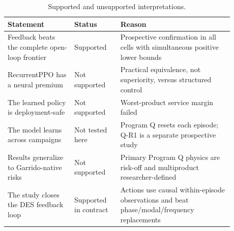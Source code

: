 \begin{table}[htbp]
\centering
\small
\caption{Supported and unsupported interpretations.}
\label{tab:claim_boundary}
\begin{tabular}{p{0.26\linewidth}p{0.18\linewidth}p{0.44\linewidth}}
\toprule
Statement & Status & Reason \\
\midrule
Feedback beats the complete open-loop frontier & Supported & Prospective confirmation in all cells with simultaneous positive lower bounds \\
RecurrentPPO has a neural premium & Not supported & Practical equivalence, not superiority, versus structured control \\
The learned policy is deployment-safe & Not supported & Worst-product service margin failed \\
The model learns across campaigns & Not tested here & Program Q resets each episode; Q-R1 is a separate prospective study \\
Results generalize to Garrido-native risks & Not supported & Primary Program Q physics are risk-off and multiproduct researcher-defined \\
The study closes the DES feedback loop & Supported in contract & Actions use causal within-episode observations and beat phase/modal/frequency replacements \\
\bottomrule
\end{tabular}
\end{table}
